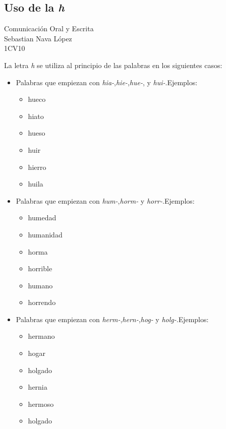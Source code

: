 \documentclass[a4paper,12pt]{article}
\newcommand{\titlehomework}[4]{\begin{center}\section*{#4}{\large #2}\\#1\\#3\\[2ex]\end{center}}
\begin{document}
\titlehomework{Sebastian Nava López}{Comunicación Oral y Escrita}{1CV10}{Uso
de la \textit{h}}
La letra \textit{h} se utiliza al principio de las palabras en los siguientes casos:
\begin{itemize}
    \item{Palabras que empiezan con \textit{hia-},\textit{hie-},\textit{hue-}, y
        \textit{hui-}.Ejemplos:
        \begin{multicols}{3}
             \begin{itemize}
              \item hueco
              \item hiato
              \item hueso
              \item huir
              \item hierro
              \item huila
        \end{itemize}
        \end{multicols}
        }
    \item{Palabras que empiezan con \textit{hum-},\textit{horm-} y \textit{horr-}.Ejemplos:
        \begin{multicols}{3}
             \begin{itemize}
              \item humedad
              \item humanidad
              \item horma
              \item horrible
              \item humano
              \item horrendo
        \end{itemize}
        \end{multicols}
        }
    \item{Palabras que empiezan con \textit{herm-},\textit{hern-},\textit{hog-} y
        \textit{holg-}.Ejemplos:
        \begin{multicols}{3}
             \begin{itemize}
              \item hermano
              \item hogar
              \item holgado
              \item hernia
              \item hermoso
              \item holgado
            \end{itemize}
        \end{multicols}
        }
\end{itemize}
\end{document}
